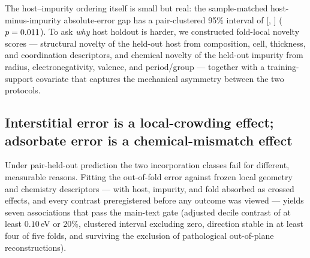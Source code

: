The host--impurity ordering itself is small but real: the sample-matched
host-minus-impurity absolute-error gap has a pair-clustered 95\% interval of
[\PRMPThreeGapCILow, \PRMPThreeGapCIHigh]\eV{}
($p=0.011$).  To ask \emph{why} host holdout is harder, we
constructed fold-local novelty scores --- structural novelty of the held-out
host from composition, cell, thickness, and coordination descriptors, and
chemical novelty of the held-out impurity from radius, electronegativity,
valence, and period/group --- together with a training-support covariate that
captures the mechanical asymmetry between the two protocols.
\PRMPThreeSupportedVerdict{}%

\subsection{Interstitial error is a local-crowding effect; adsorbate error is
a chemical-mismatch effect}
\label{sec:error_map_results}

Under pair-held-out prediction the two incorporation classes fail for
different, measurable reasons.  Fitting the out-of-fold error against frozen
local geometry and chemistry descriptors --- with host, impurity, and fold
absorbed as crossed effects, and every contrast preregistered before any
outcome was viewed --- yields seven associations that pass the main-text
gate (adjusted decile contrast of at least $0.10\,$eV or 20\%, clustered
interval excluding zero, direction stable in at least four of five folds,
and surviving the exclusion of pathological out-of-plane reconstructions).

